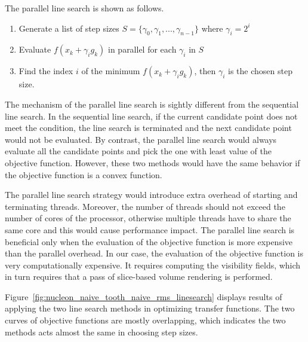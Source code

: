 The parallel line search is shown as follows.

\begin{enumerate}
	\item Generate a list of step sizes $ S= \{ \gamma_{0},\gamma_{1},...,\gamma_{n-1} \} $ where $ \gamma_{i}=2^{i} $
	\item Evaluate $ f(x_{k}+\gamma_{i} g_{k}) $ in parallel for each $ \gamma_{i} $ in $ S $
	\item Find the index $ i $ of the minimum $ f(x_{k}+\gamma_{i} g_{k}) $, then $ \gamma_{i} $ is the chosen step size.
\end{enumerate}

The mechanism of the parallel line search is sightly different from the sequential line search. In the sequential line search, if the current candidate point does not meet the condition, the line search is terminated and the next candidate point would not be evaluated. By contrast, the parallel line search would always evaluate all the candidate points and pick the one with least value of the objective function. However, these two methods would have the same behavior if the objective function is a convex function.

The parallel line search strategy would introduce extra overhead of starting and terminating threads. Moreover, the number of threads should not exceed the number of cores of the processor, otherwise multiple threads have to share the same core and this would cause performance impact. The parallel line search is beneficial only when the evaluation of the objective function is more expensive than the parallel overhead.
In our case, the evaluation of the objective function is very computationally expensive. It requires computing the visibility fields, which in turn requires that a pass of slice-based volume rendering is performed.

Figure~\ref{fig:nucleon_naive_tooth_naive_rms_linesearch} displays results of applying the two line search methods in optimizing transfer functions. The two curves of objective functions are mostly overlapping, which indicates the two methods acts almost the same in choosing step sizes.

